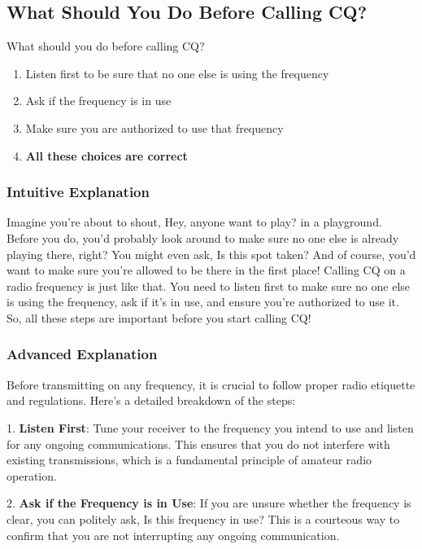 \subsection{What Should You Do Before Calling CQ?}
\label{T2A12}

\begin{tcolorbox}[colback=gray!10!white,colframe=black!75!black,title=T2A12]
What should you do before calling CQ?
\begin{enumerate}[label=\Alph*)]
    \item Listen first to be sure that no one else is using the frequency
    \item Ask if the frequency is in use
    \item Make sure you are authorized to use that frequency
    \item \textbf{All these choices are correct}
\end{enumerate}
\end{tcolorbox}

\subsubsection{Intuitive Explanation}
Imagine you’re about to shout, Hey, anyone want to play? in a playground. Before you do, you’d probably look around to make sure no one else is already playing there, right? You might even ask, Is this spot taken? And of course, you’d want to make sure you’re allowed to be there in the first place! Calling CQ on a radio frequency is just like that. You need to listen first to make sure no one else is using the frequency, ask if it’s in use, and ensure you’re authorized to use it. So, all these steps are important before you start calling CQ!

\subsubsection{Advanced Explanation}
Before transmitting on any frequency, it is crucial to follow proper radio etiquette and regulations. Here’s a detailed breakdown of the steps:

1. \textbf{Listen First}: Tune your receiver to the frequency you intend to use and listen for any ongoing communications. This ensures that you do not interfere with existing transmissions, which is a fundamental principle of amateur radio operation.

2. \textbf{Ask if the Frequency is in Use}: If you are unsure whether the frequency is clear, you can politely ask, Is this frequency in use? This is a courteous way to confirm that you are not interrupting any ongoing communication.

